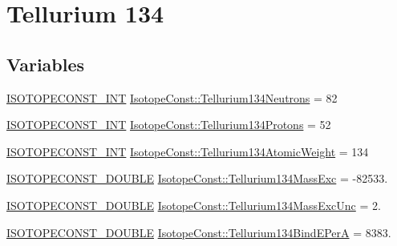 \hypertarget{group___isotope_const-_tellurium-_te134}{}\section{Tellurium 134}
\label{group___isotope_const-_tellurium-_te134}
\subsection*{Variables}
\begin{DoxyCompactItemize}
\item 
\mbox{\hyperlink{group___isotope_const-_macros_ga5f18360b3e99483a35c32d789e62621c}{I\+S\+O\+T\+O\+P\+E\+C\+O\+N\+S\+T\+\_\+\+I\+NT}} \mbox{\hyperlink{group___isotope_const-_tellurium-_te134_gae31c9ec1de4e2b1cee5be92acf45fbb4}{Isotope\+Const\+::\+Tellurium134\+Neutrons}} = 82
\item 
\mbox{\hyperlink{group___isotope_const-_macros_ga5f18360b3e99483a35c32d789e62621c}{I\+S\+O\+T\+O\+P\+E\+C\+O\+N\+S\+T\+\_\+\+I\+NT}} \mbox{\hyperlink{group___isotope_const-_tellurium-_te134_ga14601e52d1e991ac72589673ce2de137}{Isotope\+Const\+::\+Tellurium134\+Protons}} = 52
\item 
\mbox{\hyperlink{group___isotope_const-_macros_ga5f18360b3e99483a35c32d789e62621c}{I\+S\+O\+T\+O\+P\+E\+C\+O\+N\+S\+T\+\_\+\+I\+NT}} \mbox{\hyperlink{group___isotope_const-_tellurium-_te134_ga59f1ae4f5741e79de936951ab2f4ab9c}{Isotope\+Const\+::\+Tellurium134\+Atomic\+Weight}} = 134
\item 
\mbox{\hyperlink{group___isotope_const-_macros_ga8f45a7272ce02c0b4c65c44636ed719a}{I\+S\+O\+T\+O\+P\+E\+C\+O\+N\+S\+T\+\_\+\+D\+O\+U\+B\+LE}} \mbox{\hyperlink{group___isotope_const-_tellurium-_te134_gac9723bdae578044fb910af4497255407}{Isotope\+Const\+::\+Tellurium134\+Mass\+Exc}} = -\/82533.
\item 
\mbox{\hyperlink{group___isotope_const-_macros_ga8f45a7272ce02c0b4c65c44636ed719a}{I\+S\+O\+T\+O\+P\+E\+C\+O\+N\+S\+T\+\_\+\+D\+O\+U\+B\+LE}} \mbox{\hyperlink{group___isotope_const-_tellurium-_te134_ga6c00045dc468297517c7189a0119d4d3}{Isotope\+Const\+::\+Tellurium134\+Mass\+Exc\+Unc}} = 2.
\item 
\mbox{\hyperlink{group___isotope_const-_macros_ga8f45a7272ce02c0b4c65c44636ed719a}{I\+S\+O\+T\+O\+P\+E\+C\+O\+N\+S\+T\+\_\+\+D\+O\+U\+B\+LE}} \mbox{\hyperlink{group___isotope_const-_tellurium-_te134_gac5a674675515309794cad40f45ef8063}{Isotope\+Const\+::\+Tellurium134\+Bind\+E\+PerA}} = 8383.
\item 

\end{DoxyCompactItemize}
